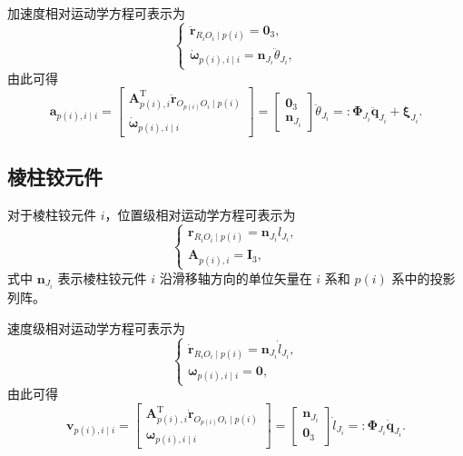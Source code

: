 加速度相对运动学方程可表示为
\begin{equation}\label{eq:10.19}
  \begin{cases}
    \ddot{\boldsymbol{r}}_{R_i O_i \mid p(i)} = \boldsymbol{0}_3, \\
    \dot{\boldsymbol{\omega}}_{p(i),i \mid i} = \boldsymbol{n}_{J_i} \ddot{\theta}_{J_i},
  \end{cases}
\end{equation}
由此可得
\begin{equation}\label{eq:10.20}
  \boldsymbol{a}_{p(i),i \mid i} = \begin{bmatrix} \boldsymbol{A}_{p(i),i}^{\mathrm{T}} \ddot{\boldsymbol{r}}_{O_{p(i)} O_i \mid p(i)} \\ \dot{\boldsymbol{\omega}}_{p(i),i \mid i} \end{bmatrix}
  = \begin{bmatrix} \boldsymbol{0}_3 \\ \boldsymbol{n}_{J_i} \end{bmatrix} \ddot{\theta}_{J_i}
  =: \boldsymbol{\Phi}_{J_i} \ddot{\boldsymbol{q}}_{J_i} + \boldsymbol{\xi}_{J_i}.
\end{equation}

\subsection{棱柱铰元件}

对于棱柱铰元件 $i$，位置级相对运动学方程可表示为
\begin{equation}\label{eq:10.21}
  \begin{cases}
    \boldsymbol{r}_{R_i O_i \mid p(i)} = \boldsymbol{n}_{J_i} l_{J_i}, \\
    \boldsymbol{A}_{p(i),i} = \boldsymbol{I}_3,
  \end{cases}
\end{equation}
式中 $\boldsymbol{n}_{J_i}$ 表示棱柱铰元件 $i$ 沿滑移轴方向的单位矢量在 $i$ 系和 $p(i)$ 系中的投影列阵。

速度级相对运动学方程可表示为
\begin{equation}\label{eq:10.22}
  \begin{cases}
    \dot{\boldsymbol{r}}_{R_i O_i \mid p(i)} = \boldsymbol{n}_{J_i} \dot{l}_{J_i}, \\
    \boldsymbol{\omega}_{p(i),i \mid i} = \boldsymbol{0},
  \end{cases}
\end{equation}
由此可得
\begin{equation}\label{eq:10.23}
  \boldsymbol{v}_{p(i),i \mid i} = \begin{bmatrix} \boldsymbol{A}_{p(i),i}^{\mathrm{T}} \dot{\boldsymbol{r}}_{O_{p(i)} O_i \mid p(i)} \\ \boldsymbol{\omega}_{p(i),i \mid i} \end{bmatrix}
  = \begin{bmatrix} \boldsymbol{n}_{J_i} \\ \boldsymbol{0}_3 \end{bmatrix} \dot{l}_{J_i}
  =: \boldsymbol{\Phi}_{J_i} \dot{\boldsymbol{q}}_{J_i}.
\end{equation}

